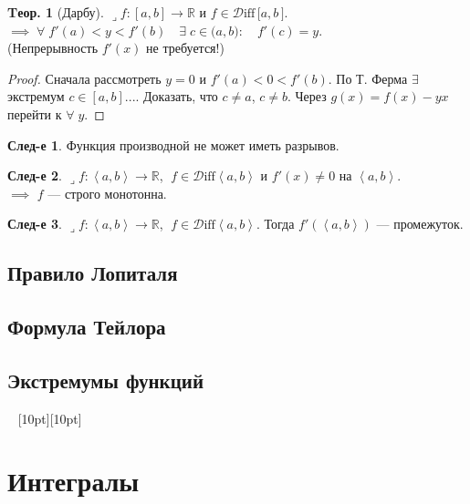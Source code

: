 \documentclass[a4paper,12pt]{article}
\numberwithin{figure}{section}
\theoremstyle{definition}
\newtheorem{theorem}{Tеор.}[section]
\newtheorem*{corollary}{След-е} %
\def\R{\mathbb{R}}
\def\Diff{\!\in\!\mathcal{D}\mathrm{iff}}
\def\on{\!:}
\def\intab{\left<a,b\right>}
\def\lets{{\huge$\lrcorner$}\space}
\def\any{$\forall\;$}
\def\vignette{\vspace{48pt} \noindent \hrulefill~ \raisebox{-8pt}[10pt][10pt]{\Huge\ding{102}}~ \hrulefill}
\begin{document}
\begin{theorem}[Дарбу]
	\lets $f\on[a,b]\to\R$ и $f\Diff \, \pmb{\pmb{[}} a,b \,\pmb{\pmb{]}}$. \\
	$\implies \; \forall\; f'(a) < y < f'(b) \quad \exists \; c\in\pmb{(}a,b\pmb{)}: \quad f'(c)=y$. \\
	(Непрерывность $f'(x)$ не требуется!)
\end{theorem}
\begin{proof}
	Сначала рассмотреть $y=0$ и $f'(a)<0<f'(b)$.
	По Т. Ферма $\exists$ экстремум $c\in[a,b]$....
	Доказать, что $c \ne a$, $c \ne b$.
	Через $g(x)=f(x)-yx$ перейти к \any$y$.
\end{proof}

\begin{corollary}
	Функция производной не может иметь разрывов.
\end{corollary}

\begin{corollary}
	\lets $f\on\intab\to\R$, $\;f\Diff\intab$ и $f'(x)\ne 0$ на $\intab$. \\
	$\implies$ $f$ --- строго монотонна.
\end{corollary}

\begin{corollary}
	\lets $f\on\intab\to\R$, $\;f\Diff\intab$. Тогда $f'(\intab)$ --- промежуток.
\end{corollary}



\subsection{Правило Лопиталя}


\subsection{Формула Тейлора}


\subsection{Экстремумы функций}




\vignette
\section{Интегралы}
\end{document}
